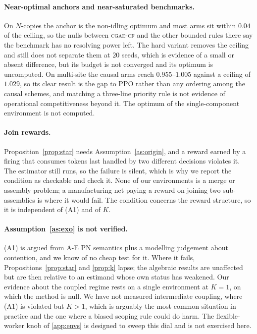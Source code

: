 \documentclass[review,authoryear,3p,times]{elsarticle}
\newcommand{\cflow}{\textsc{cgae-cf}}          %
\begin{document}
\paragraph{Near-optimal anchors and near-saturated benchmarks.} On $N$-copies
the anchor is the non-idling optimum and most arms sit within $0.04$ of the
ceiling, so the nulls between \cflow{} and the other bounded rules there say
the benchmark has no resolving power left. The hard variant removes the
ceiling and still does not separate them at $20$ seeds, which is evidence of a
small or absent difference, but its budget is not converged and its optimum is
uncomputed. On multi-site the causal arms reach $0.955$--$1.005$ against a
ceiling of $1.029$, so its clear result is the gap to PPO rather than any
ordering among the causal schemes, and matching a three-line priority rule is
not evidence of operational competitiveness beyond it. The optimum of the
single-component environment is not computed.

\paragraph{Join rewards.} Proposition~\ref{prop:star} needs
Assumption~\ref{as:origin}, and a reward earned by a firing that consumes
tokens last handled by two different decisions violates it. The estimator
still runs, so the failure is silent, which is why we report the condition as
checkable and check it. None of our environments is a merge or assembly
problem; a manufacturing net paying a reward on joining two sub-assemblies is
where it would fail. The condition concerns the reward structure, so it is
independent of (A1) and of $K$.

\paragraph{Assumption~\ref{as:exo} is not verified.} (A1) is argued from A-E
PN semantics plus a modelling judgement about contention, and we know of no
cheap test for it. Where it fails, Propositions~\ref{prop:star} and
\ref{prop:k} lapse; the algebraic results are unaffected but are then relative
to an estimand whose own status has weakened. Our evidence about the coupled
regime rests on a single environment at $K=1$, on which the method is null. We
have not measured intermediate coupling, where (A1) is violated but $K>1$,
which is arguably the most common situation in practice and the one where a
biased scoping rule could do harm. The flexible-worker knob of \ref{app:envs}
is designed to sweep this dial and is not exercised here.
\end{document}
